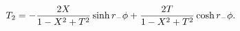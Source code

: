 \begin{equation}
T_2 = -{2 X \over 1-X^2+T^2}  \sinh r_- \phi +  {2 T \over
  1-X^2+T^2} \cosh r_- \phi.
\end{equation}


